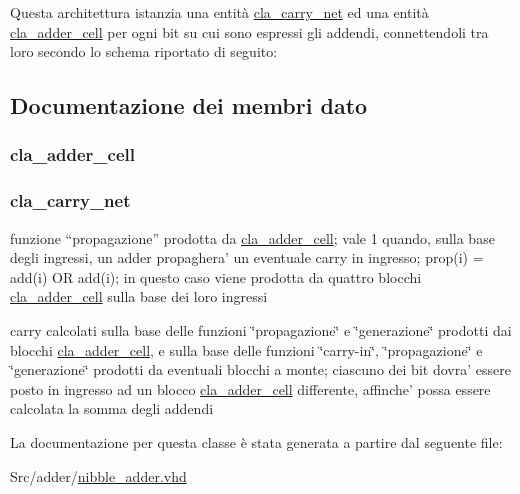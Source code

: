 Questa architettura istanzia una entità \hyperlink{classcla__carry__net}{cla\+\_\+carry\+\_\+net} ed una entità \hyperlink{classcla__adder__cell}{cla\+\_\+adder\+\_\+cell} per ogni bit su cui sono espressi gli addendi, connettendoli tra loro secondo lo schema riportato di seguito\+:  

\subsection{Documentazione dei membri dato}
\hypertarget{classnibble__adder_1_1structural_a9d7a8a381439c61aea549e7a47ec7a6f}{
\subsubsection[{adder}]{ {\bfseries \textcolor{vhdlchar}{cla\+\_\+adder\+\_\+cell}\textcolor{vhdlchar}{ }} \hspace{0.3cm}{\ttfamily [Instantiation]}}}\label{classnibble__adder_1_1structural_a9d7a8a381439c61aea549e7a47ec7a6f}
\hypertarget{classnibble__adder_1_1structural_abbf8fdf15c2d70392ab929c8ebe57439}{
\subsubsection[{cla\+\_\+net}]{ {\bfseries \textcolor{vhdlchar}{cla\+\_\+carry\+\_\+net}\textcolor{vhdlchar}{ }} \hspace{0.3cm}{\ttfamily [Instantiation]}}}\label{classnibble__adder_1_1structural_abbf8fdf15c2d70392ab929c8ebe57439}


funzione “propagazione” prodotta da \hyperlink{classcla__adder__cell}{cla\+\_\+adder\+\_\+cell}; vale 1 quando, sulla base degli ingressi, un adder propaghera' un eventuale carry in ingresso; prop(i) = add(i) O\+R add(i); in questo caso viene prodotta da quattro blocchi \hyperlink{classcla__adder__cell}{cla\+\_\+adder\+\_\+cell} sulla base dei loro ingressi 

carry calcolati sulla base delle funzioni \char`\"{}propagazione\char`\"{} e \char`\"{}generazione\char`\"{} prodotti dai blocchi \hyperlink{classcla__adder__cell}{cla\+\_\+adder\+\_\+cell}, e sulla base delle funzioni \char`\"{}carry-\/in\char`\"{}, \char`\"{}propagazione\char`\"{} e \char`\"{}generazione\char`\"{} prodotti da eventuali blocchi a monte; ciascuno dei bit dovra' essere posto in ingresso ad un blocco \hyperlink{classcla__adder__cell}{cla\+\_\+adder\+\_\+cell} differente, affinche' possa essere calcolata la somma degli addendi 

La documentazione per questa classe è stata generata a partire dal seguente file\+:\begin{DoxyCompactItemize}
\item 
Src/adder/\hyperlink{nibble__adder_8vhd}{nibble\+\_\+adder.\+vhd}\end{DoxyCompactItemize}
